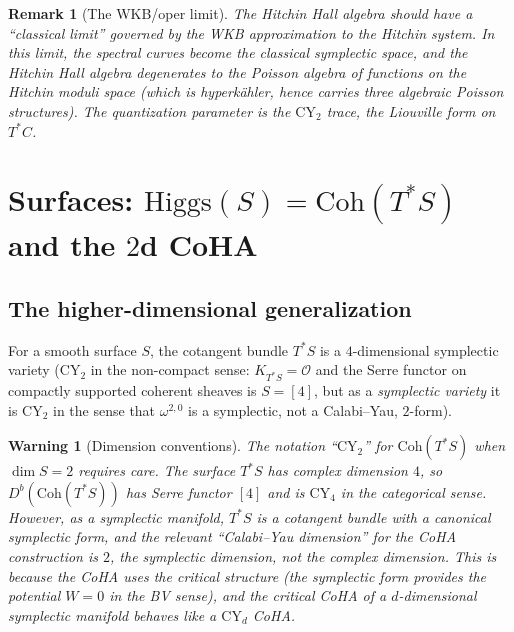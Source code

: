 \documentclass[11pt]{article}
\theoremstyle{garamondthm}
\theoremstyle{garamonddef}
\theoremstyle{garamondrem}
\newtheorem{remark}[theorem]{Remark}
\newtheorem{warning}[theorem]{Warning}
\newcommand{\Coh}{\mathrm{Coh}}
\newcommand{\CY}{\mathrm{CY}}
\newcommand{\cO}{\mathcal{O}}
\newcommand{\Higgs}{\mathrm{Higgs}}
\begin{document}
\begin{remark}[The WKB/oper limit]
\label{rem:wkb}
The Hitchin Hall algebra should have a ``classical limit'' governed by the WKB approximation to the Hitchin system. In this limit, the spectral curves become the classical symplectic space, and the Hitchin Hall algebra degenerates to the Poisson algebra of functions on the Hitchin moduli space (which is hyperk\"ahler, hence carries three algebraic Poisson structures). The quantization parameter is the $\CY_2$ trace, the Liouville form on $T^*C$.
\end{remark}



\section{Surfaces: $\Higgs(S) = \Coh(T^*S)$ and the $2$d CoHA}
\label{sec:surfaces}

\subsection{The higher-dimensional generalization}
\label{ssec:higher-dim}

For a smooth surface $S$, the cotangent bundle $T^*S$ is a $4$-dimensional symplectic variety ($\CY_2$ in the non-compact sense: $K_{T^*S} = \cO$ and the Serre functor on compactly supported coherent sheaves is $S = [4]$, but as a \emph{symplectic variety} it is $\CY_2$ in the sense that $\omega^{2,0}$ is a symplectic, not a Calabi--Yau, $2$-form).

\begin{warning}[Dimension conventions]
\label{warn:dim-conventions}
The notation ``$\CY_2$'' for $\Coh(T^*S)$ when $\dim S = 2$ requires care. The surface $T^*S$ has complex dimension $4$, so $D^b(\Coh(T^*S))$ has Serre functor $[4]$ and is $\CY_4$ in the categorical sense. However, as a \emph{symplectic} manifold, $T^*S$ is a cotangent bundle with a canonical symplectic form, and the relevant ``Calabi--Yau dimension'' for the CoHA construction is $2$, the symplectic dimension, not the complex dimension. This is because the CoHA uses the \emph{critical} structure (the symplectic form provides the potential $W = 0$ in the BV sense), and the critical CoHA of a $d$-dimensional symplectic manifold behaves like a $\CY_d$ CoHA.
\end{warning}
\end{document}
